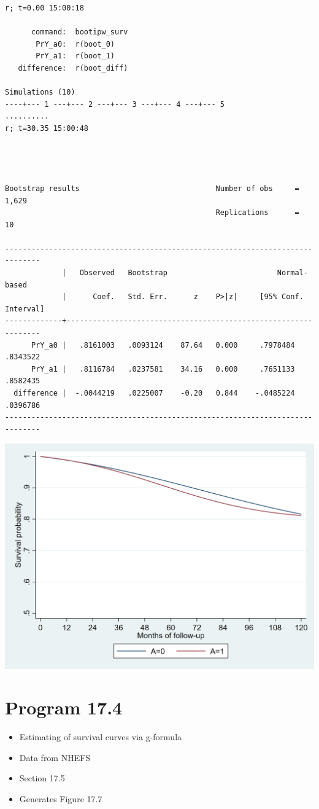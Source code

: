 \documentclass[
  10pt,
]{book}
\providecommand{\tightlist}{%
  \setlength{\itemsep}{0pt}\setlength{\parskip}{0pt}}
\begin{document}
\begin{verbatim}
r; t=0.00 15:00:18

      command:  bootipw_surv
       PrY_a0:  r(boot_0)
       PrY_a1:  r(boot_1)
   difference:  r(boot_diff)

Simulations (10)
----+--- 1 ---+--- 2 ---+--- 3 ---+--- 4 ---+--- 5 
..........
r; t=30.35 15:00:48




Bootstrap results                               Number of obs     =      1,629
                                                Replications      =         10

------------------------------------------------------------------------------
             |   Observed   Bootstrap                         Normal-based
             |      Coef.   Std. Err.      z    P>|z|     [95% Conf. Interval]
-------------+----------------------------------------------------------------
      PrY_a0 |   .8161003   .0093124    87.64   0.000     .7978484    .8343522
      PrY_a1 |   .8116784   .0237581    34.16   0.000     .7651133    .8582435
  difference |  -.0044219   .0225007    -0.20   0.844    -.0485224    .0396786
------------------------------------------------------------------------------
\end{verbatim}

\begin{center}\includegraphics[width=0.85\linewidth]{./figs/stata-fig-17-3} \end{center}

\hypertarget{program-17.4-1}{%
\section{Program 17.4}\label{program-17.4-1}}

\begin{itemize}
\tightlist
\item
  Estimating of survival curves via g-formula
\item
  Data from NHEFS
\item
  Section 17.5
\item
  Generates Figure 17.7
\end{itemize}
\end{document}
